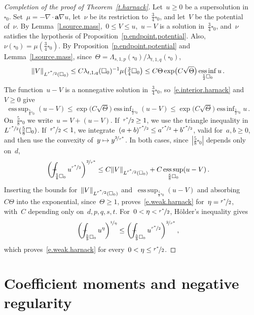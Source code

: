 \documentclass[11pt,letterpaper]{article}
\numberwithin{equation}{section}
\theoremstyle{definition}
\renewcommand{\a}{\mathbf{a}}
\newcommand{\nf}{\nicefrac}
\newcommand{\cu}{\square}
\DeclareMathOperator*{\esssup}{ess\,sup}
\DeclareMathOperator*{\essinf}{ess\,inf}
\DeclarePairedDelimiter{\norm}{\lVert}{\rVert}
\def\Xint#1{\mathchoice
	{\XXint\displaystyle\textstyle{#1}}%
	{\XXint\textstyle\scriptstyle{#1}}%
	{\XXint\scriptstyle\scriptscriptstyle{#1}}%
	{\XXint\scriptscriptstyle\scriptscriptstyle{#1}}%
	\!\int}
\def\XXint#1#2#3{{\setbox0=\hbox{$#1{#2#3}{\int}$}
		\vcenter{\hbox{$#2#3$}}\kern-.5\wd0}}
\def\fint{\Xint-}
\begin{document}
\begin{proof}[Completion of the proof of Theorem~\ref{t.harnack}]
Let~$u\geq0$ be a supersolution in~$\cu_0$. Set~$\mu=-\nabla\cdot\a\nabla u$, let~$\nu$ be its restriction to~$\frac34\cu_0$, and let~$V$ be the potential of~$\nu$. By Lemma~\ref{l.source.mass},~$0\leq V\leq u$,~$u-V$ is a solution in~$\frac34\cu_0$, and~$\nu$ satisfies the hypothesis of Proposition~\ref{p.endpoint.potential}. Also,~$\nu(\cu_0)=\mu(\frac34\cu_0)$. By Proposition~\ref{p.endpoint.potential} and Lemma~\ref{l.source.mass}, since~$\Theta=\Lambda_{s,1,p}(\cu_0)/\lambda_{t,1,q}(\cu_0)$,
\begin{equation*}
	\norm{V}_{L^{\nf{r^*}2}(\cu_0)}\leq C\lambda_{t,1,q}(\cu_0)^{-1}\mu\bigl(\tfrac34\cu_0\bigr)\leq C\Theta\exp\bigl(C\sqrt\Theta\bigr)\essinf_{\frac12\cu_0}u\,.
\end{equation*}
The function~$u-V$ is a nonnegative solution in~$\frac34\cu_0$, so~\eqref{e.interior.harnack} and~$V\geq0$ give
\begin{equation*}
	\esssup_{\frac58\cu_0}(u-V)\leq\exp\bigl(C\sqrt\Theta\bigr)\essinf_{\frac12\cu_0}(u-V)\leq\exp\bigl(C\sqrt\Theta\bigr)\essinf_{\frac12\cu_0}u\,.
\end{equation*}
On~$\frac58\cu_0$ we write~$u=V+(u-V)$. If~$\nf{r^*}2\geq1$, we use the triangle inequality in~$L^{\nf{r^*}2}(\frac58\cu_0)$. If~$\nf{r^*}2<1$, we integrate~$(a+b)^{\nf{r^*}2}\leq a^{\nf{r^*}2}+b^{\nf{r^*}2}$, valid for~$a,b\geq0$, and then use the convexity of~$y\mapsto y^{\nf2{r^*}}$. In both cases, since~$|\frac58\cu_0|$ depends only on~$d$,
\begin{equation*}
	\biggl(\fint_{\frac58\cu_0}u^{\nf{r^*}2}\biggr)^{\nf2{r^*}}\leq C\norm{V}_{L^{\nf{r^*}2}(\cu_0)}+C\esssup_{\frac58\cu_0}(u-V)\,.
\end{equation*}
Inserting the bounds for~$\norm{V}_{L^{\nf{r^*}2}(\cu_0)}$ and~$\esssup_{\frac58\cu_0}(u-V)$ and absorbing~$C\Theta$ into the exponential, since~$\Theta\geq1$, proves~\eqref{e.weak.harnack} for~$\eta=\nf{r^*}2$, with~$C$ depending only on~$d,p,q,s,t$. For~$0<\eta<\nf{r^*}2$, H\"older's inequality gives
\begin{equation*}
	\biggl(\fint_{\frac58\cu_0}u^\eta\biggr)^{\nf1\eta}\leq\biggl(\fint_{\frac58\cu_0}u^{\nf{r^*}2}\biggr)^{\nf2{r^*}}\,,
\end{equation*}
which proves~\eqref{e.weak.harnack} for every~$0<\eta\leq\nf{r^*}2$.
\end{proof}

\section{Coefficient moments and negative regularity}
\label{s.classical.moments}
\end{document}
